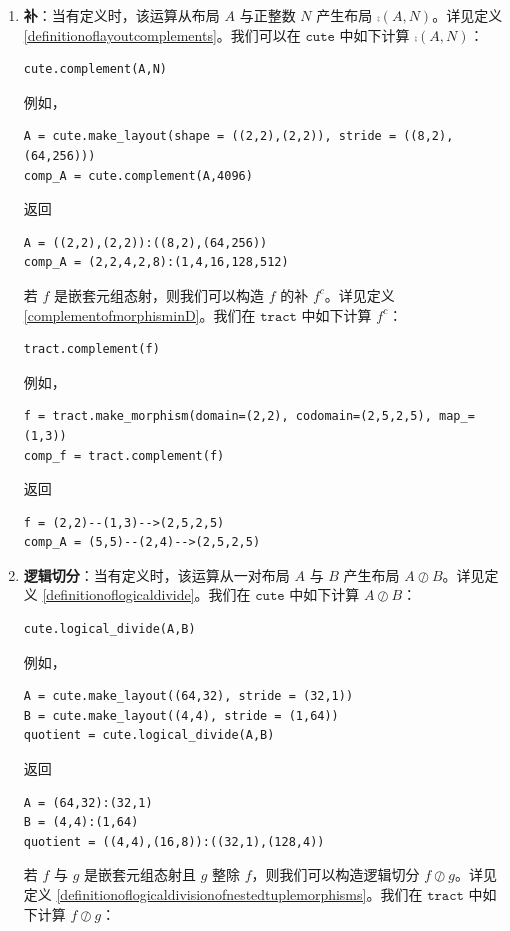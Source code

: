 \begin{enumerate}[left=0pt]
\item {\bf 补}：当有定义时，该运算从布局 $A$ 与正整数 $N$ 产生布局 $\comp(A,N)$。详见定义 \ref{definitionoflayoutcomplements}。我们可以在 $\texttt{cute}$ 中如下计算 $\comp(A,N)$：
\begin{lstlisting}[language=cutedsl]
cute.complement(A,N)
\end{lstlisting}
例如，
\begin{lstlisting}[language=cutedsl]
A = cute.make_layout(shape = ((2,2),(2,2)), stride = ((8,2),(64,256)))
comp_A = cute.complement(A,4096)
\end{lstlisting}
返回
\begin{lstlisting}[language=cutedsl]
A = ((2,2),(2,2)):((8,2),(64,256))
comp_A = (2,2,4,2,8):(1,4,16,128,512)
\end{lstlisting}
若 $f$ 是嵌套元组态射，则我们可以构造 $f$ 的补 $f^c$。详见定义 \ref{complementofmorphisminD}。我们在 $\texttt{tract}$ 中如下计算 $f^c$：
\begin{lstlisting}[language=cutedsl]
tract.complement(f)
\end{lstlisting}
例如，
\begin{lstlisting}[language=cutedsl]
f = tract.make_morphism(domain=(2,2), codomain=(2,5,2,5), map_=(1,3))
comp_f = tract.complement(f)
\end{lstlisting}
返回
\begin{lstlisting}[language=cutedsl]
f = (2,2)--(1,3)-->(2,5,2,5)
comp_A = (5,5)--(2,4)-->(2,5,2,5)
\end{lstlisting}
\item {\bf 逻辑切分}：当有定义时，该运算从一对布局 $A$ 与 $B$ 产生布局 $A \oslash B$。详见定义 \ref{definitionoflogicaldivide}。我们在 $\texttt{cute}$ 中如下计算 $A \oslash B$：
\begin{lstlisting}[language=cutedsl]
cute.logical_divide(A,B)
\end{lstlisting}
例如，
\begin{lstlisting}[language=cutedsl]
A = cute.make_layout((64,32), stride = (32,1))
B = cute.make_layout((4,4), stride = (1,64))
quotient = cute.logical_divide(A,B)
\end{lstlisting}
返回
\begin{lstlisting}[language=cutedsl]
A = (64,32):(32,1)
B = (4,4):(1,64)
quotient = ((4,4),(16,8)):((32,1),(128,4))
\end{lstlisting}
若 $f$ 与 $g$ 是嵌套元组态射且 $g$ 整除 $f$，则我们可以构造逻辑切分 $f \oslash g$。详见定义 \ref{definitionoflogicaldivisionofnestedtuplemorphisms}。我们在 $\texttt{tract}$ 中如下计算 $f \oslash g$：

\end{enumerate}
